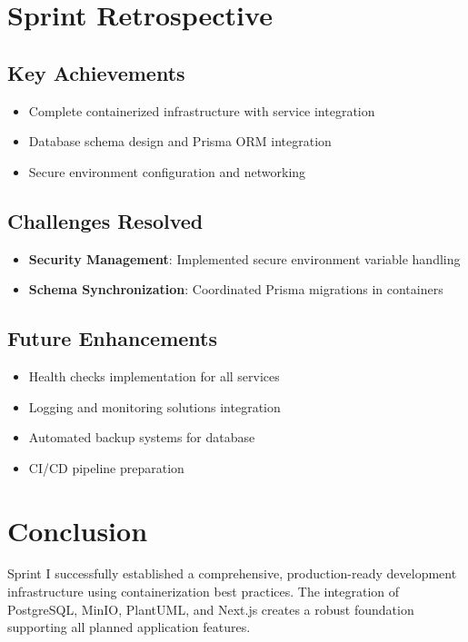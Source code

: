\section{Sprint Retrospective}

\subsection{Key Achievements}
\begin{itemize}
    \item  Complete containerized infrastructure with service integration
    \item  Database schema design and Prisma ORM integration
    \item  Secure environment configuration and networking
\end{itemize}

\subsection{Challenges Resolved}
\begin{itemize}
    \item \textbf{Security Management}: Implemented secure environment variable handling
    \item \textbf{Schema Synchronization}: Coordinated Prisma migrations in containers
\end{itemize}

\subsection{Future Enhancements}
\begin{itemize}
    \item Health checks implementation for all services
    \item Logging and monitoring solutions integration
    \item Automated backup systems for database
    \item CI/CD pipeline preparation
\end{itemize}

\section{Conclusion}

Sprint I successfully established a comprehensive, production-ready development infrastructure using containerization best practices. The integration of PostgreSQL, MinIO, PlantUML, and Next.js creates a robust foundation supporting all planned application features.
